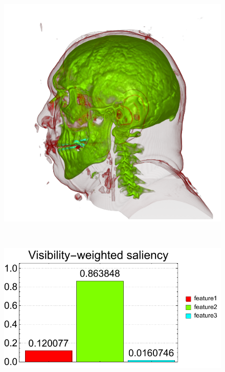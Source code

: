 \begin{figure}
\begin{minipage}{.24\textwidth}
		\includegraphics[width=1\linewidth]{images/vismale_naive_optimized_green_1000}
		\subcaption{}
	\end{minipage}~
	\begin{minipage}{.25\textwidth}
		\includegraphics[width=1\linewidth]{figures/vismale_naive_optimized_green_1000_visibility_saliency_weighted_chart}
		\subcaption{}
	\end{minipage}~
	\begin{minipage}{.24\textwidth}

\end{minipage}
\end{figure}
